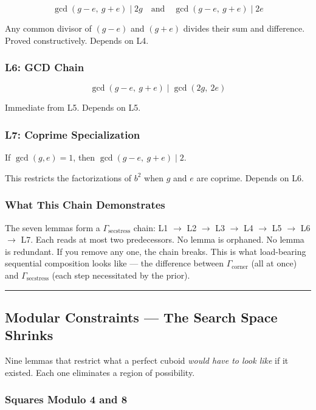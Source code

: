 \documentclass[12pt,a4paper]{article}
\begin{document}
\[\gcd(g-e,\ g+e) \mid 2g \quad\text{and}\quad \gcd(g-e,\ g+e) \mid 2e\]

Any common divisor of $(g-e)$ and $(g+e)$ divides their sum and difference. Proved constructively. Depends on L4.

\subsubsection{L6: GCD Chain}

\[\gcd(g-e,\ g+e) \mid \gcd(2g,\ 2e)\]

Immediate from L5. Depends on L5.

\subsubsection{L7: Coprime Specialization}

If $\gcd(g, e) = 1$, then $\gcd(g-e,\ g+e) \mid 2$.

This restricts the factorizations of $b^2$ when $g$ and $e$ are coprime. Depends on L6.

\subsubsection{What This Chain Demonstrates}

The seven lemmas form a $\Gamma_{\text{secstress}}$ chain: L1 $\rightarrow$ L2 $\rightarrow$ L3 $\rightarrow$ L4 $\rightarrow$ L5 $\rightarrow$ L6 $\rightarrow$ L7. Each reads at most two predecessors. No lemma is orphaned. No lemma is redundant. If you remove any one, the chain breaks. This is what load-bearing sequential composition looks like --- the difference between $\Gamma_{\text{corner}}$ (all at once) and $\Gamma_{\text{secstress}}$ (each step necessitated by the prior).

\begin{center}
\rule{0.5\textwidth}{0.4pt}
\end{center}

\subsection{Modular Constraints --- The Search Space Shrinks}

Nine lemmas that restrict what a perfect cuboid \emph{would have to look like} if it existed. Each one eliminates a region of possibility.

\subsubsection{Squares Modulo 4 and 8}
\end{document}
